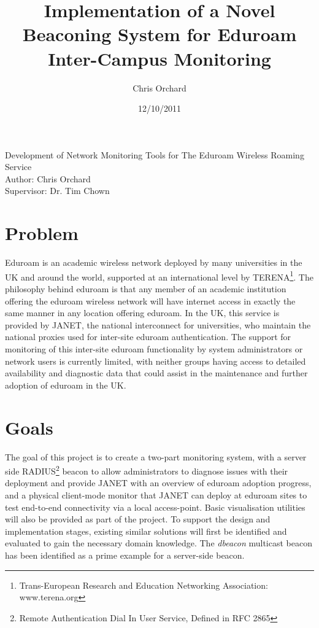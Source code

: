 \documentclass[pdflatex, a4paper,12pt]{article}
\title{Implementation of a Novel Beaconing System for Eduroam
 Inter-Campus Monitoring}
\author{Chris Orchard}
\date{12/10/2011}
\begin{document}
\begin{center}
{\LARGE Development of Network Monitoring Tools for The Eduroam 
Wireless Roaming Service}\\[1em]

Author: Chris Orchard\\
Supervisor: Dr. Tim Chown
\end{center}

\section{Problem}


Eduroam is an academic wireless network deployed by many universities in the UK
and around the world, supported at an international level by
TERENA\footnote[1]{Trans-European Research and Education Networking Association:
www.terena.org}. The philosophy behind eduroam
is that any member of an academic
institution offering the eduroam wireless network will have internet access in
exactly the same manner in any location offering eduroam. In the UK, this
service is provided by JANET, the national interconnect for
universities, who maintain the national proxies used for inter-site eduroam
authentication. The support for monitoring of this inter-site eduroam functionality by system administrators or network
users is currently limited, with neither groups having access to detailed
availability and diagnostic data that could assist in the maintenance and
further adoption of eduroam in the UK.

\section{Goals}

The goal of this project is to create a two-part monitoring system, with a
server side RADIUS\footnote[2]{Remote Authentication Dial In User Service,
Defined in RFC
2865} beacon to allow administrators to diagnose issues with their
deployment and provide JANET with an overview of eduroam adoption progress, and
a physical client-mode monitor that JANET can deploy at eduroam sites to test
end-to-end connectivity via a local access-point. Basic visualisation utilities will
also be provided as part of the project. To support the design and implementation
stages, existing similar solutions will first be identified and evaluated to
gain the necessary domain knowledge. The \emph{dbeacon} multicast beacon has been identified
as a prime example for a server-side beacon.
 
\end{document}
